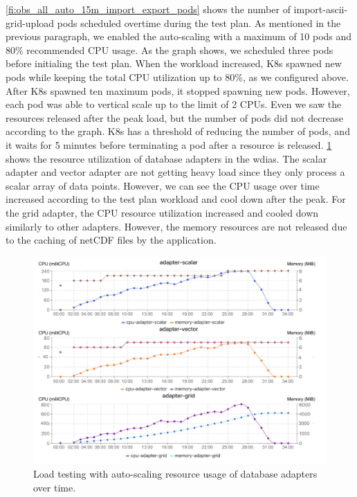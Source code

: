 \cref{fi:obs_all_auto_15m_import_export_pods} shows the number of import-ascii-grid-upload pods scheduled overtime during the test plan. As mentioned in the previous paragraph, we enabled the auto-scaling with a maximum of 10 pods and 80\% recommended CPU usage. As the graph shows, we scheduled three pods before initialing the test plan. When the workload increased, K8s spawned new pods while keeping the total CPU utilization up to 80\%, as we configured above. After K8s spawned ten maximum pods, it stopped spawning new pods. However, each pod was able to vertical scale up to the limit of 2 CPUs. Even we saw the resources released after the peak load, but the number of pods did not decrease according to the graph. K8s has a threshold of reducing the number of pods, and it waits for 5 minutes before terminating a pod after a resource is released. \cref{fi:obs_all_auto_15m_adapter_dbs_res} shows the resource utilization of database adapters in the \acrshort{wdias}. The scalar adapter and vector adapter are not getting heavy load since they only process a scalar array of data points. However, we can see the CPU usage over time increased according to the test plan workload and cool down after the peak. For the grid adapter, the CPU resource utilization increased and cooled down similarly to other adapters. However, the memory resources are not released due to the caching of netCDF files by the application.

\begin{figure}[htp]
    \centering
    \includegraphics[width=1.0\textwidth]{results/obs/all_auto/obs_all_auto_15m_adapter_dbs_res.pdf}
    \caption{Load testing with auto-scaling resource usage of database adapters over time.}
    \label{fi:obs_all_auto_15m_adapter_dbs_res}
\end{figure}


